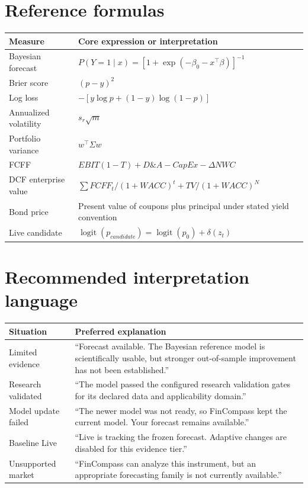 \documentclass[11pt]{article}
\newcommand{\logit}{\operatorname{logit}}
\begin{document}
\section{Reference formulas}
\begin{longtable}{p{}p{}}
\toprule
Measure & Core expression or interpretation\\
\midrule
\endhead
Bayesian forecast & $P(Y=1\mid x)=\left[1+\exp(-\beta_0-x^\top\beta)\right]^{-1}$\\
Brier score & $(p-y)^2$\\
Log loss & $-[y\log p+(1-y)\log(1-p)]$\\
Annualized volatility & $s_r\sqrt{m}$\\
Portfolio variance & $w^\top\Sigma w$\\
FCFF & $EBIT(1-T)+D\&A-CapEx-\Delta NWC$\\
DCF enterprise value & $\sum FCFF_t/(1+WACC)^t + TV/(1+WACC)^N$\\
Bond price & Present value of coupons plus principal under stated yield convention\\
Live candidate & $\logit(p_{candidate})=\logit(p_0)+\delta(z_t)$\\
\bottomrule
\end{longtable}

\section{Recommended interpretation language}
\begin{longtable}{p{}p{}}
\toprule
Situation & Preferred explanation\\
\midrule
\endhead
Limited evidence & ``Forecast available. The Bayesian reference model is scientifically usable, but stronger out-of-sample improvement has not been established.''\\
Research validated & ``The model passed the configured research validation gates for its declared data and applicability domain.''\\
Model update failed & ``The newer model was not ready, so FinCompass kept the current model. Your forecast remains available.''\\
Baseline Live & ``Live is tracking the frozen forecast. Adaptive changes are disabled for this evidence tier.''\\
Unsupported market & ``FinCompass can analyze this instrument, but an appropriate forecasting family is not currently available.''\\
\bottomrule
\end{longtable}
\end{document}
